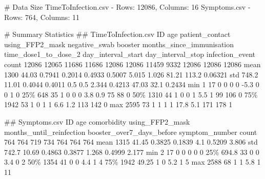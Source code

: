 \documentclass[11pt]{article}
\begin{document}
\begin{codeoutput}
\# Data Size
TimeToInfection.csv - Rows: 12086, Columns: 16
Symptoms.csv - Rows: 764, Columns: 11

\# Summary Statistics
\#\# TimeToInfection.csv
         ID   age  patient\_contact  using\_FFP2\_mask  negative\_swab  booster  months\_since\_immunisation  time\_dose1\_to\_dose\_2  day\_interval\_start  day\_interval\_stop  infection\_event
count 12086 12065            11686            11686          12086    12086                      11459                  9332               12086              12086            12086
mean   1300 44.03           0.7941           0.2014         0.4933   0.5007                      5.015                 1.026               81.21              113.2          0.06321
std   748.2 11.01           0.4044           0.4011            0.5      0.5                      2.344                0.4213               47.03               32.1           0.2434
min       1    17                0                0              0        0                       -5.3                     0                   0                  1                0
25\%     648    35                1                0              0        0                        3.8                   0.9                  75                 88                0
50\%    1310    44                1                0              0        1                        5.5                     1                  99                106                0
75\%    1942    53                1                0              1        1                        6.6                   1.2                 113                142                0
max    2595    73                1                1              1        1                       17.8                   5.1                 171                178                1

\#\# Symptoms.csv
         ID   age  comorbidity  using\_FFP2\_mask  months\_until\_reinfection  booster\_over7\_days\_before  symptom\_number
count   764   764          719              734                       764                        764             764
mean   1315 41.45       0.3825           0.1839                       4.1                     0.5209           3.806
std   742.7 10.69       0.4863           0.3877                     1.268                     0.4999           2.177
min       2    17            0                0                         0                          0               0
25\%   694.8    33            0                0                       3.4                          0               2
50\%    1354    41            0                0                       4.4                          1               4
75\%    1942 49.25            1                0                       5.2                          1               5
max    2588    68            1                1                       5.8                          1              11


\end{codeoutput}
\end{document}
